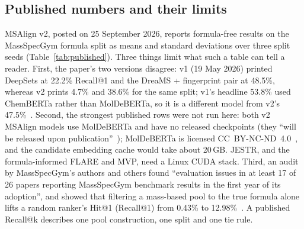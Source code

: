 \documentclass[11pt]{article}
\begin{document}
\subsection{Published numbers and their limits}\label{sec:published}
MSAlign v2, posted on 25 September 2026, reports formula-free results on the MassSpecGym formula split as means
and standard deviations over three split seeds (Table~\ref{tab:published}). Three things limit what such a table
can tell a reader. First, the paper's two versions disagree: v1 (19 May 2026) printed DeepSets at 22.2\% Recall@1 and
the DreaMS + fingerprint pair at 48.5\%, whereas v2 prints 4.7\% and 38.6\% for the same split; v1's headline 53.8\%
used ChemBERTa rather than MolDeBERTa, so it is a different model from v2's 47.5\%~\citep{krzakala2026msalignv1,
krzakala2026msalignv2}. Second, the strongest published rows were not run here: both v2 MSAlign models use
MolDeBERTa and have no released checkpoints (they ``will be released upon publication''~\citep{krzakala2026msalignv2}); MolDeBERTa is licensed
CC~BY-NC-ND~4.0~\citep{moldeberta_card}, and the candidate embedding cache would take about 20\,GB. JESTR, and the
formula-informed FLARE and MVP, need a Linux CUDA stack. Third, an audit by MassSpecGym's authors and others found
``evaluation issues in at least 17 of 26 papers reporting MassSpecGym benchmark results in the first year of its
adoption'', and showed that filtering a mass-based pool to the true formula alone lifts a random ranker's Hit@1
(Recall@1) from 0.43\% to 12.98\%~\citep{liu2026wild}. A published Recall@k describes one pool construction, one
split and one tie rule.
\end{document}
